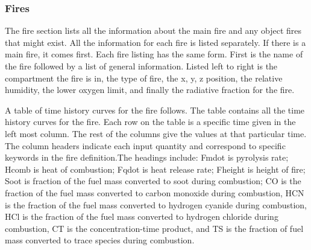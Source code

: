\subsubsection{Fires}

The fire section lists all the information about the main fire and any object fires that might exist.  All the information for each fire is listed separately.  If there is a main fire, it comes first.  Each fire listing has the same form.  First is the name of the fire followed by a list of general information.  Listed left to right is the compartment the fire is in, the type of fire, the x, y, z position, the relative humidity, the lower oxygen limit, and finally the radiative fraction for the fire.

A table of time history curves for the fire follows.  The table contains all the time history curves for the fire.  Each row on the table is a specific time given in the left most column.  The rest of the columns give the values at that particular time.  The column headers indicate each input quantity and correspond to specific keywords in the fire definition.The headings include: Fmdot is pyrolysis rate; Hcomb is heat of combustion; Fqdot is heat release rate; Fheight is height of fire; Soot is fraction of the fuel mass converted to soot during combustion; CO is the fraction of the fuel mass converted to carbon monoxide during combustion, HCN is the fraction of the fuel mass converted to hydrogen cyanide during combustion, HCl is the fraction of the fuel mass converted to hydrogen chloride during combustion, CT is the concentration-time product, and TS is the fraction of fuel mass converted to trace species during combustion.

